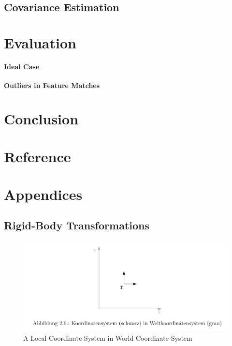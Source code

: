 \documentclass[a4paper]{report}
\numberwithin{figure}{section}
\begin{document}
\section{Covariance Estimation} \label{sc_covariance_estim}

\chapter{Evaluation} \label{cp_evaluation}

\subsubsection{Ideal Case} \label{sb_sb_sc_ideal_case}

\subsubsection{Outliers in Feature Matches} \label{sb_sb_sc_outliers}


\chapter{Conclusion} \label{cp_conc}

\chapter{Reference} \label{cp_ref}


\chapter{Appendices} \label{cp_appendices}

\section{Rigid-Body Transformations} \label{sc_rigid_body_transformations}

\begin{figure}[H]
	\centering
	\includegraphics[width=\linewidth,natwidth=640,natheight=640]
	{fig/ref_imgs/2d_local_coords_in_world_coords.png}
  \caption{A Local Coordinate System in World Coordinate System}
	\label{fig:2d_local_coords_in_world_coords}
\end{figure}
\end{document}
